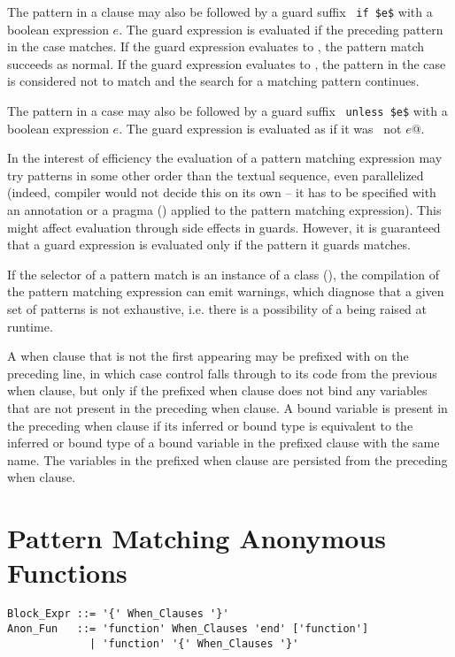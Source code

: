 The pattern in a  clause may also be followed by a guard suffix ~\lstinline!if $e$! with a boolean expression $e$. The guard expression is evaluated if the preceding pattern in the case matches. If the guard expression evaluates to , the pattern match succeeds as normal. If the guard expression evaluates to , the pattern in the case is considered not to match and the search for a matching pattern continues. 

The pattern in a case may also be followed by a guard suffix ~\lstinline!unless $e$! with a boolean expression $e$. The guard expression is evaluated as if it was ~\lstinline@if not $e$@. 

In the interest of efficiency the evaluation of a pattern matching expression may try patterns in some other order than the textual sequence, even parallelized (indeed, compiler would not decide this on its own -- it has to be specified with an annotation or a pragma () applied to the pattern matching expression). This might affect evaluation through side effects in guards. However, it is guaranteed that a guard expression is evaluated only if the pattern it guards matches.

If the selector of a pattern match is an instance of a  class (), the compilation of the pattern matching expression can emit warnings, which diagnose that a given set of patterns is not exhaustive, i.e. there is a possibility of a  being raised at runtime. 

A when clause that is not the first appearing may be prefixed with  on the preceding line, in which case control falls through to its code from the previous when clause, but only if the prefixed when clause does not bind any variables that are not present in the preceding when clause. A bound variable is present in the preceding when clause if its inferred or bound type is equivalent to the inferred or bound type of a bound variable in the prefixed clause with the same name. The variables in the prefixed when clause are persisted from the preceding when clause. 






\section{Pattern Matching Anonymous Functions}
\label{sec:pattern-matching-anon-fun}

\syntax\begin{lstlisting}
Block_Expr ::= '{' When_Clauses '}'
Anon_Fun   ::= 'function' When_Clauses 'end' ['function']
             | 'function' '{' When_Clauses '}'
\end{lstlisting}

